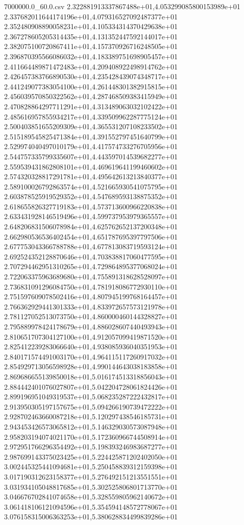 \begin{filecontents*}{7000000.0_60.0.csv}
2.322881913337867488e+01,4.053299085800153989e+01
2.337682011644174196e+01,4.079316527092487377e+01
2.352480908890058231e+01,4.105334314370429638e+01
2.367278605205314435e+01,4.131352447592144017e+01
2.382075100720867411e+01,4.157370926716248505e+01
2.396870395566086032e+01,4.183389751698905457e+01
2.411664489871472483e+01,4.209408922498914762e+01
2.426457383766890530e+01,4.235428439074348717e+01
2.441249077383054100e+01,4.261448301382915815e+01
2.456039570850322562e+01,4.287468509383415949e+01
2.470828864297711291e+01,4.313489063032102422e+01
2.485616957855934217e+01,4.339509962287775124e+01
2.500403851655209309e+01,4.365531207108233502e+01
2.515189545825471384e+01,4.391552797451640799e+01
2.529974040497010179e+01,4.417574733276705956e+01
2.544757335799335607e+01,4.443597014539682277e+01
2.559539431862808101e+01,4.469619641199460602e+01
2.574320328817291781e+01,4.495642613213840377e+01
2.589100026792863574e+01,4.521665930541075795e+01
2.603878525919529352e+01,4.547689593138875352e+01
2.618655826327719183e+01,4.573713600966220838e+01
2.633431928146519496e+01,4.599737953979365557e+01
2.648206831506078984e+01,4.625762652137200348e+01
2.662980536536402454e+01,4.651787695397797506e+01
2.677753043366788788e+01,4.677813083719593124e+01
2.692524352128870646e+01,4.703838817060477595e+01
2.707294462951310265e+01,4.729864895377068024e+01
2.722063375963689680e+01,4.755891318628528097e+01
2.736831091296084750e+01,4.781918086772930110e+01
2.751597609078502416e+01,4.807945199768164457e+01
2.766362929441301333e+01,4.833972657573121978e+01
2.781127052513073750e+01,4.860000460144328827e+01
2.795889978424178679e+01,4.886028607440493943e+01
2.810651707304127100e+01,4.912057099419871520e+01
2.825412239283066640e+01,4.938085936040351953e+01
2.840171574491003170e+01,4.964115117260917032e+01
2.854929713056598928e+01,4.990144643038183858e+01
2.869686655139850018e+01,5.016174513318856043e+01
2.884442401076027807e+01,5.042204728061824426e+01
2.899196951049319537e+01,5.068235287222432817e+01
2.913950305197157675e+01,5.094266190739472222e+01
2.928702463660087218e+01,5.120297438546185731e+01
2.943453426573065812e+01,5.146329030573087948e+01
2.958203194074021170e+01,5.172360966744508914e+01
2.972951766296354492e+01,5.198393246983687277e+01
2.987699143375023425e+01,5.224425871202402050e+01
3.002445325441094681e+01,5.250458839312159398e+01
3.017190312623158377e+01,5.276492151213551551e+01
3.031934105048817685e+01,5.302525806801713770e+01
3.046676702841074658e+01,5.328559805962140672e+01
3.061418106121094596e+01,5.354594148572778067e+01
3.076158315006363253e+01,5.380628834499839286e+01

\end{filecontents*}
